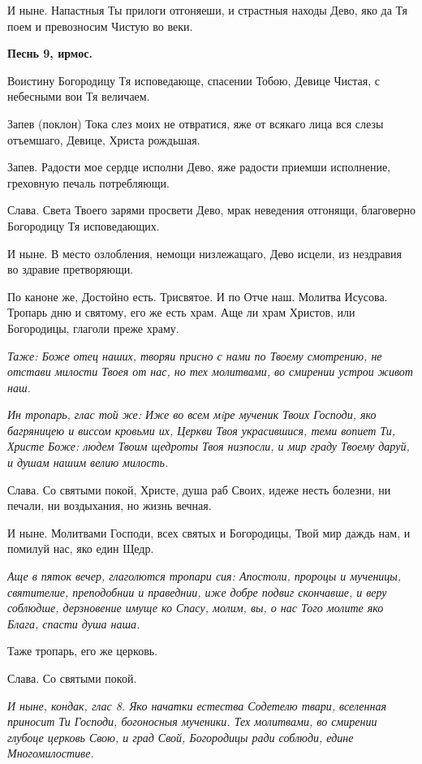 И ныне. Напастныя Ты прилоги отгоняеши, и страстныя находы Дево, яко да Тя поем и превозносим Чистую во веки.


\medskip


\bfseries Песнь 9, ирмос.\normalfont{}


Воистину Богородицу Тя исповедающе, спасении Тобою, Девице Чистая, с небесными вои Тя величаем.

Запев (поклон) Тока слез моих не отвратися, яже от всякаго лица вся слезы отъемшаго, Девице, Христа  рождьшая.

Запев. Радости мое сердце исполни Дево, яже радости приемши исполнение, греховную печаль потребляющи.

Слава. Света Твоего зарями просвети Дево, мрак неведения отгонящи, благоверно Богородицу Тя исповедающих.

И ныне. В место озлобления, немощи низлежащаго, Дево исцели, из нездравия во здравие претворяющи.

По каноне же, Достойно есть. Трисвятое. И по Отче наш. Молитва Исусова. Тропарь дню и святому, его же есть храм. Аще ли храм Христов, или Богородицы, глаголи преже храму.


\itshape Таже:\normalfont{} Боже отец наших, творяи присно с нами по Твоему смотрению, не отстави милости Твоея от нас, но тех молитвами, во смирении устрои живот наш.


\itshape Ин тропарь, глас той же:\normalfont{} Иже во всем мiре мученик Твоих Господи, яко багряницею и виссом кровьми их, Церкви Твоя украсившися, теми вопиет Ти, Христе Боже: людем Твоим щедроты Твоя низпосли, и мир граду Твоему даруй, и душам нашим велию милость.

Слава. Со святыми покой, Христе, душа раб Своих, идеже несть болезни, ни печали, ни воздыхания, но жизнь вечная.

И ныне. Молитвами Господи, всех святых и Богородицы, Твой мир даждь нам, и помилуй нас, яко един Щедр.


\itshape Аще в пяток вечер, глаголются тропари сия:\normalfont{} Апостоли, пророцы и мученицы, святителие, преподобнии и праведнии, иже добре подвиг скончавше, и веру соблюдше, дерзновение имуще ко Спасу, молим, вы, о нас Того молите яко Блага, спасти душа наша.

Таже тропарь, его же церковь.

Слава. Со святыми покой.


\itshape И ныне, кондак, глас 8.\normalfont{} Яко начатки естества Содетелю твари, вселенная приносит Ти Господи, богоносныя мученики. Тех молитвами, во смирении глубоце церковь Свою, и град Свой, Богородицы ради соблюди, едине Многомилостиве.


